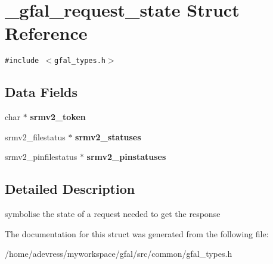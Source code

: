 \section{\_\-gfal\_\-request\_\-state Struct Reference}
\label{struct__gfal__request__state}
{\tt \#include $<$gfal\_\-types.h$>$}

\subsection*{Data Fields}
\begin{CompactItemize}
\item 
char $\ast$ \textbf{srmv2\_\-token}\label{struct__gfal__request__state_fb894137417d237a47ad4fe38a3acede}

\item 
srmv2\_\-filestatus $\ast$ \textbf{srmv2\_\-statuses}\label{struct__gfal__request__state_dd7a800ece5d4f08656d6ebb399d333b}

\item 
srmv2\_\-pinfilestatus $\ast$ \textbf{srmv2\_\-pinstatuses}\label{struct__gfal__request__state_882d10ccee4ae1a8a639cde3584b9ac9}

\end{CompactItemize}


\subsection{Detailed Description}
symbolise the state of a request needed to get the response 



The documentation for this struct was generated from the following file:\begin{CompactItemize}
\item 
/home/adevress/myworkspace/gfal/src/common/gfal\_\-types.h\end{CompactItemize}
